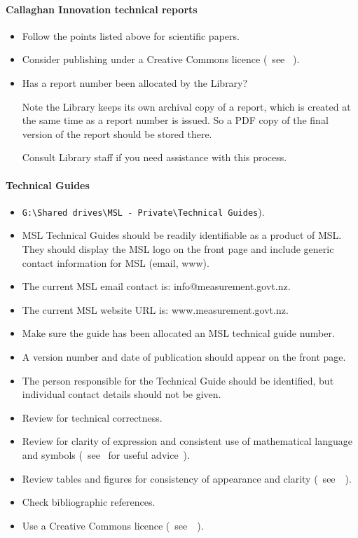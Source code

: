 \paragraph{Callaghan Innovation technical reports}
\begin{itemize}
\item  Follow the points listed above for scientific papers.
\item  Consider publishing under a Creative Commons licence (~see \cite[\S\ref*{GRP-s_copyright}]{MSL_Reporting_Guidelines}~).
\item  Has a report number been allocated by the Library? 

\vspace{\baselineskip}
Note the Library keeps its own archival copy of a report, which is created at the same time as a report number is issued. So a PDF copy of the final version of the report should be stored there. 

\vspace{\baselineskip}Consult Library staff if you need assistance with this process.
\end{itemize} 

\paragraph{Technical Guides}

\begin{itemize}
\item {}
\verb|G:\Shared drives\MSL - Private\Technical Guides|).
\item MSL Technical Guides should be readily identifiable as a product of MSL. They should display the MSL logo on the front page and include generic contact information for MSL (email, www). 
\item  The current MSL email contact is: info@measurement.govt.nz.
\item  The current MSL website URL is: www.measurement.govt.nz.
\item  Make sure the guide has been allocated an MSL technical guide number.
\item  A version number and date of publication should appear on the front page.
\item  The person responsible for the Technical Guide should be identified, but individual contact details should not be given.
\item  Review for technical correctness.
\item  Review for clarity of expression and consistent use of mathematical language and symbols (~see~\cite[\S\ref*{GRP-s:scientific_documents}]{MSL_Reporting_Guidelines} for useful advice~).
\item  Review tables and figures for consistency of appearance and clarity (~see~\cite[\S\ref*{GRP-s:scientific_documents}]{MSL_Reporting_Guidelines}~).
\item  Check bibliographic references. 
\item  Use a Creative Commons licence (~see~\cite[\S\ref*{GRP-s_copyright}]{MSL_Reporting_Guidelines}~).
\end{itemize}

